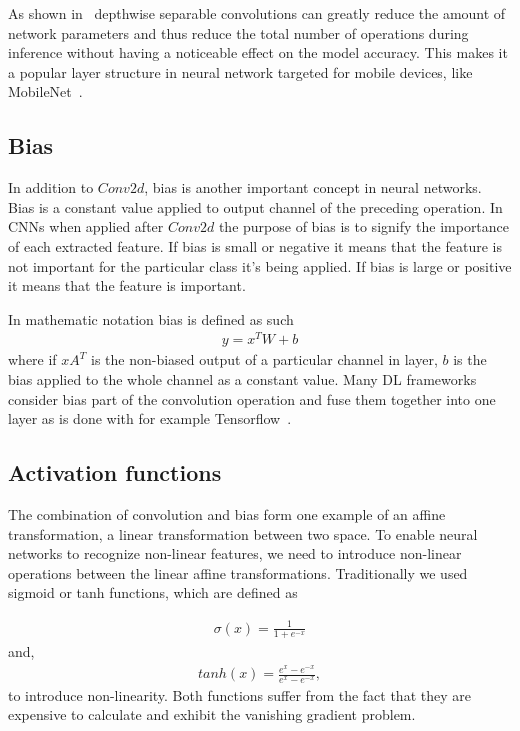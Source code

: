 \documentclass[12pt,a4paper,english
]{tunithesis}
\begin{document}
As shown in~\cite{tan_efficientnet_2020} depthwise separable convolutions can greatly reduce the amount of network parameters and thus reduce the total number of operations during inference without having a noticeable effect on the model accuracy. This makes it a popular layer structure in neural network targeted for mobile devices, like MobileNet~\cite{howard2017mobilenetsefficientconvolutionalneural}.


\subsection{Bias}
In addition to $Conv2d$, bias is another important concept in neural networks. Bias is a constant value applied to output channel of the preceding operation. In CNNs when applied after $Conv2d$ the purpose of bias is to signify the importance of each extracted feature. If bias is small or negative it means that the feature is not important for the particular class it's being applied. If bias is large or positive it means that the feature is important.~\cite{DeepLearningBook}

In mathematic notation bias is defined as such
\begin{align}
y = x^{T}W + b
\end{align}
where if $xA^{T}$ is the non-biased output of a particular channel in layer, $b$ is the bias applied to the whole channel as a constant value. Many DL frameworks consider bias part of the convolution operation and fuse them together into one layer as is done with for example Tensorflow~\cite{tensorflow2015-whitepaper}.

\subsection{Activation functions}
The combination of convolution and bias form one example of an affine transformation, a linear transformation between two space.
To enable neural networks to recognize non-linear features, we need to introduce non-linear operations between the linear affine transformations. Traditionally we used sigmoid or tanh functions, which are defined as

\begin{align}
\sigma(x) = \frac{1}{1+e^{-x}}
\end{align}
and,
\begin{align}
tanh(x) = \frac{e^{x}-e^{-x}}{e^{x}-e^{-x}},
\end{align}
to introduce non-linearity. Both functions suffer from the fact that they are expensive to calculate and exhibit the vanishing gradient problem.~\parencite{DeepLearningBook}
\end{document}
